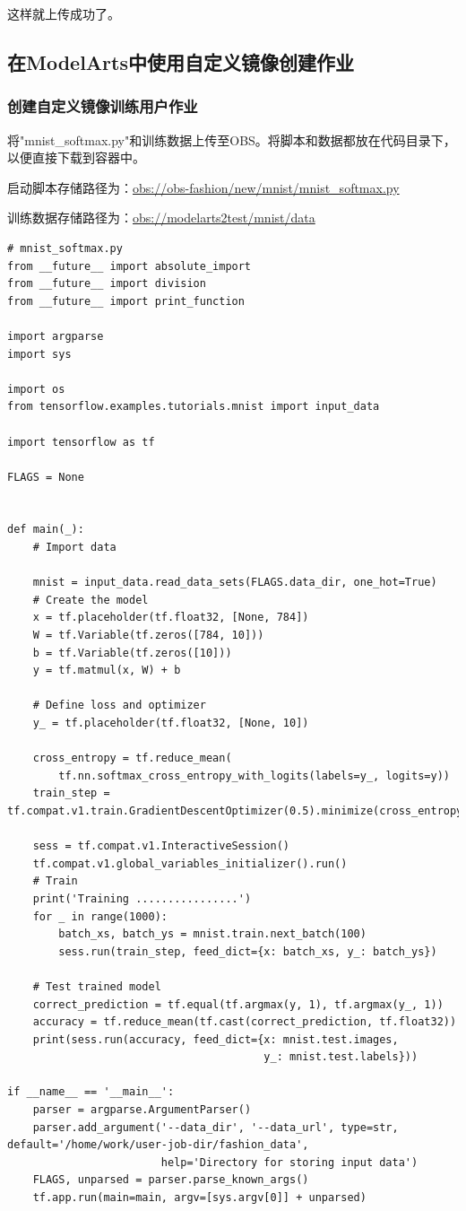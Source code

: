 \documentclass[fontset=windows,openany,UTF8]{ctexbook}
\begin{document}
这样就上传成功了。

\subsection{在ModelArts中使用自定义镜像创建作业}

\subsubsection{创建自定义镜像训练用户作业}

将"mnist\_softmax.py"和训练数据上传至OBS。将脚本和数据都放在代码目录下，以便直接下载到容器中。

启动脚本存储路径为：\url{obs://obs-fashion/new/mnist/mnist_softmax.py}

训练数据存储路径为：\url{obs://modelarts2test/mnist/data}

\lstset{language=python}
\begin{lstlisting}
# mnist_softmax.py
from __future__ import absolute_import
from __future__ import division
from __future__ import print_function

import argparse
import sys

import os
from tensorflow.examples.tutorials.mnist import input_data

import tensorflow as tf

FLAGS = None


def main(_):
    # Import data

    mnist = input_data.read_data_sets(FLAGS.data_dir, one_hot=True)
    # Create the model
    x = tf.placeholder(tf.float32, [None, 784])
    W = tf.Variable(tf.zeros([784, 10]))
    b = tf.Variable(tf.zeros([10]))
    y = tf.matmul(x, W) + b

    # Define loss and optimizer
    y_ = tf.placeholder(tf.float32, [None, 10])

    cross_entropy = tf.reduce_mean(
        tf.nn.softmax_cross_entropy_with_logits(labels=y_, logits=y))
    train_step = tf.compat.v1.train.GradientDescentOptimizer(0.5).minimize(cross_entropy)

    sess = tf.compat.v1.InteractiveSession()
    tf.compat.v1.global_variables_initializer().run()
    # Train
    print('Training ................')
    for _ in range(1000):
        batch_xs, batch_ys = mnist.train.next_batch(100)
        sess.run(train_step, feed_dict={x: batch_xs, y_: batch_ys})

    # Test trained model
    correct_prediction = tf.equal(tf.argmax(y, 1), tf.argmax(y_, 1))
    accuracy = tf.reduce_mean(tf.cast(correct_prediction, tf.float32))
    print(sess.run(accuracy, feed_dict={x: mnist.test.images,
                                        y_: mnist.test.labels}))

if __name__ == '__main__':
    parser = argparse.ArgumentParser()
    parser.add_argument('--data_dir', '--data_url', type=str, default='/home/work/user-job-dir/fashion_data',
                        help='Directory for storing input data')
    FLAGS, unparsed = parser.parse_known_args()
    tf.app.run(main=main, argv=[sys.argv[0]] + unparsed)
\end{lstlisting}
\end{document}
